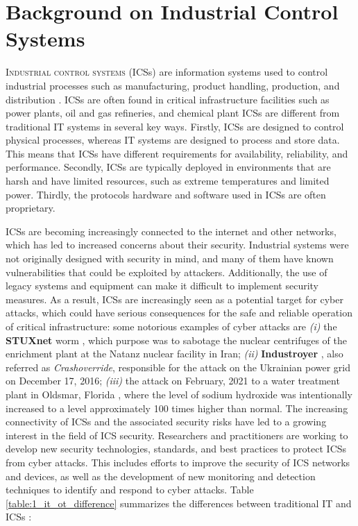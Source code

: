 \chapter{Background on Industrial Control Systems}
\label{background}

\linenumbers
\lettrine[lines=2]{I}{ndustrial control systems} (ICSs) are information systems used to control industrial processes such as manufacturing, product handling, production, and distribution \cite{ics_definition}. ICSs are often found in critical infrastructure facilities such as power plants, oil and gas refineries, and chemical plant
\bigskip
ICSs are different from traditional IT systems in several key ways. Firstly, ICSs are designed to control physical processes, whereas IT systems are designed to process and store data. This means that ICSs have different requirements for availability, reliability, and performance. Secondly, ICSs are typically deployed in environments that are harsh and have limited resources, such as extreme temperatures and limited power. Thirdly, the protocols hardware and software used in ICSs are often proprietary. 

\bigskip
ICSs are becoming increasingly connected to the internet and other networks, which has led to increased concerns about their security. Industrial systems were not originally designed with security in mind, and many of them have known vulnerabilities that could be exploited by attackers. Additionally, the use of legacy systems and equipment can make it difficult to implement security measures. As a result, ICSs are increasingly seen as a potential target for cyber attacks, which could have serious consequences for the safe and reliable operation of critical infrastructure: some notorious examples of cyber attacks are \textit{(i)} the \textbf{STUXnet} worm \cite{stuxnet}, which purpose was to sabotage the nuclear centrifuges of the enrichment plant at the Natanz nuclear facility in Iran; \textit{(ii)} \textbf{Industroyer} \cite{industroyer}, also referred as \textit{Crashoverride}, responsible for the attack on the Ukrainian power grid on December 17, 2016; \textit{(iii)} the attack on February, 2021 to a water treatment plant in Oldsmar, Florida \cite{attacco_florida}, where the level of sodium hydroxide was intentionally increased to a level approximately 100 times higher than normal. \newline \newline
The increasing connectivity of ICSs and the associated security risks have led to a growing interest in the field of ICS security. Researchers and practitioners are working to develop new security technologies, standards, and best practices to protect ICSs from cyber attacks. This includes efforts to improve the security of ICS networks and devices, as well as the development of new monitoring and detection techniques to identify and respond to cyber attacks.\newline \newline
Table \ref{table:1_it_ot_difference} summarizes the differences between traditional IT and ICSs \cite{tesi_phd_norvegese}:

